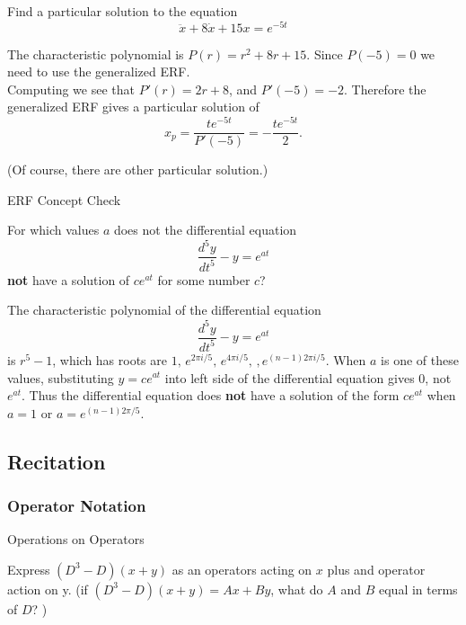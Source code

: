 \begin{example}
  Find a particular solution to the equation
  \begin{equation*}
    \displaystyle  \ddot{x} + 8\dot{x} + 15 x = e^{-5t}
  \end{equation*}
\end{example}

The characteristic polynomial is $P(r) = r^2 + 8r + 15$. Since $P(-5) = 0$
we need to use the generalized ERF.\\

Computing we see that $P \prime (r) = 2r + 8$, and $P \prime (-5) = -2$.
Therefore the generalized ERF gives a particular solution of
\begin{equation*}
  x_p = \frac{te^{-5t}}{P \prime (-5)} = - \frac{te^{-5t}}{2}.
\end{equation*}

(Of course, there are other particular solution.)

\begin{exercise}
  ERF Concept Check
\end{exercise}
For which values $a$ does not the differential equation
\begin{equation*}
  \displaystyle  \frac{d^5 y}{dt^5} - y = e^{at}
\end{equation*}
\textbf{not} have a solution of $ce^{at}$ for some number $c$? 


The characteristic polynomial of the differential equation
\begin{equation*}
  \displaystyle  \frac{d^5 y}{dt^5} - y = e^{at}
\end{equation*}
is $r^5 -1$, which has roots are $1,\, e^{2 \pi i / 5},\, e^{4 \pi i / 5},\, , e^{(n-1) 2 \pi i / 5}$.
When $a$ is one of these values, substituting $y = ce^{at}$ into left side of the differential
equation gives $0$, not $e^{at}$.
Thus the differential equation does \textbf{not} have a solution of the form $ce^{at}$ when
$a=1$ or $a = e^{(n-1)2 \pi/5}$. 

\clearpage
\subsection{Recitation}

\subsubsection{Operator Notation}

\begin{problem}
  Operations on Operators
\end{problem}
Express $(D^3 -D)(x+y)$ as an operators acting on $x$ plus and operator action on y.
(if $(D^3 -D)(x+y) = Ax + By$, what do $A$ and $B$ equal in terms of $D$? )\\

